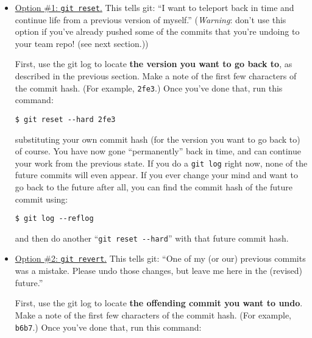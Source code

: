 \vspace{-.1in}
\begin{itemize}
\itemsep.5em


\item \underline{Option \#1: \texttt{git reset}.} This tells git: ``I want to
teleport back in time and continue life from a previous version of myself.''
(\textit{Warning}: don't use this option if you've already pushed some of the
commits that you're undoing to your team repo! (see next section.))

First, use the git log to locate \textbf{the version you want to go back to},
as described in the previous section. Make a note of the first few characters
of the commit hash. (For example, \texttt{2fe3}.) Once you've done that, run
this command:

\vspace{-.1in}
\begin{Verbatim}[fontsize=\small,samepage=true,frame=none]
  $ git reset --hard 2fe3
\end{Verbatim}
\vspace{-.1in}

substituting your own commit hash (for the version you want to go back to) of
course. You have now gone ``permanently'' back in time, and can continue your
work from the previous state. If you do a \texttt{git log} right now, none of
the future commits will even appear. If you ever change your mind and want to
go back to the future after all, you can find the commit hash of the future
commit using:

\vspace{-.1in}
\begin{Verbatim}[fontsize=\small,samepage=true,frame=none]
  $ git log --reflog
\end{Verbatim}
\vspace{-.1in}

and then do another ``\texttt{git reset -{}-hard}'' with that future commit
hash.



\item \underline{Option \#2: \texttt{git revert}.} This tells git: ``One of my
(or our) previous commits was a mistake. Please undo those changes, but leave
me here in the (revised) future.''

First, use the git log to locate \textbf{the offending commit you want to
undo}. Make a note of the first few characters of the commit hash. (For
example, \texttt{b6b7}.) Once you've done that, run this command:


\end{itemize}
